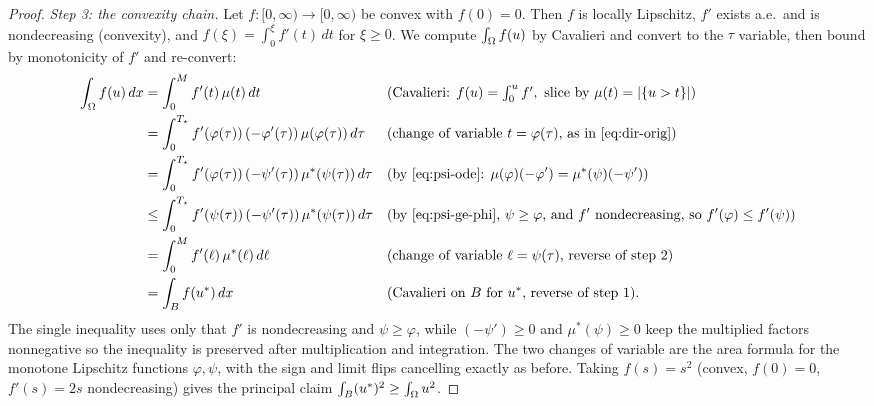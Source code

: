 \begin{proof}
\emph{Step 3: the convexity chain.} Let $f:[0,\infty)\to[0,\infty)$ be
convex with $f(0)=0$. Then $f$ is locally Lipschitz, $f'$ exists a.e.\ and
is nondecreasing (convexity), and $f(\xi)=\int_0^\xi f'(t)\,dt$ for
$\xi\ge0$. We compute $\int_\Omega f(u)$ by Cavalieri and convert to the $\tau$
variable, then bound by monotonicity of $f'$ and re-convert:
\begin{align*}
  \int_\Omega f(u)\,dx
  &=\int_0^M f'(t)\,\mu(t)\,dt
   &&\text{(Cavalieri: }f(u)=\textstyle\int_0^u f', \text{ slice by }
     \mu(t)=\left|\{u>t\}\right|)\\
  &=\int_0^{T_\star}f'(\varphi(\tau))\,(-\varphi'(\tau))\,\mu(\varphi(\tau))
     \,d\tau
   &&\text{(change of variable }t=\varphi(\tau)\text{, as in
     \eqref{eq:dir-orig})}\\
  &=\int_0^{T_\star}f'(\varphi(\tau))\,(-\psi'(\tau))\,\mu^*(\psi(\tau))
     \,d\tau
   &&\text{(by \eqref{eq:psi-ode}: }\mu(\varphi)(-\varphi')
     =\mu^*(\psi)(-\psi'))\\
  &\le\int_0^{T_\star}f'(\psi(\tau))\,(-\psi'(\tau))\,\mu^*(\psi(\tau))
     \,d\tau
   &&\text{(by \eqref{eq:psi-ge-phi}, }\psi\ge\varphi\text{, and }f'
     \text{ nondecreasing, so }f'(\varphi)\le f'(\psi))\\
  &=\int_0^M f'(\ell)\,\mu^*(\ell)\,d\ell
   &&\text{(change of variable }\ell=\psi(\tau)\text{, reverse of step 2)}\\
  &=\int_B f(u^*)\,dx
   &&\text{(Cavalieri on }B\text{ for }u^*\text{, reverse of step 1).}
\end{align*}
The single inequality uses only that $f'$ is nondecreasing and $\psi\ge
\varphi$, while $(-\psi')\ge0$ and $\mu^*(\psi)\ge0$ keep the multiplied
factors nonnegative so the inequality is preserved after multiplication and
integration. The two changes of variable are the area formula for the
monotone Lipschitz functions $\varphi,\psi$, with the sign and limit flips
cancelling exactly as before. Taking $f(s)=s^2$ (convex, $f(0)=0$,
$f'(s)=2s$ nondecreasing) gives the principal claim $\int_B(u^*)^2\ge
\int_\Omega u^2$.


\end{proof}
